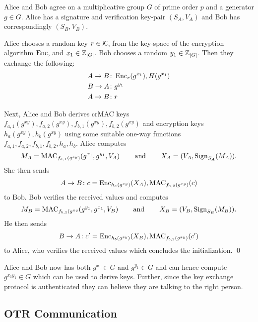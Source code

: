 \begin{protocol}\label{proto:otrinit}
  Alice and Bob agree on a multiplicative group \(G\) of prime order \(p\) and 
  a generator \(g\in G\).
  Alice has a signature and verification key-pair \((S_A, V_A)\) and Bob has 
  correspondingly \((S_B, V_B)\).

  Alice chooses a random key \(r\in \operatorname{\mathcal K}\), from the key-space of the encryption 
  algorithm \(\operatorname{\mathrm{Enc}}\), and \(x_1\in \operatorname{\mathbb Z}_{|G|}\).
  Bob chooses a random \(y_1\in \operatorname{\mathbb Z}_{|G|}\).
  Then they exchange the following:
  \begin{align*}
    A\to B &\colon \operatorname{\mathrm{Enc}}_r( g^{x_1} ), H( g^{x_1} ) \\
    B\to A &\colon g^{y_1} \\
    A\to B &\colon r
  \end{align*}

  Next, Alice and Bob derives \ac{crMAC} keys \(f_{a,1}( g^{xy} ), f_{a,2}( 
  g^{xy} ), f_{b,1}( g^{xy} ), f_{b,2}( g^{xy} )\) and encryption keys \(h_a( 
  g^{xy} ), h_b( g^{xy} )\) using some suitable one-way functions \(f_{a,1}, 
  f_{a,2}, f_{b,1}, f_{b,2}, h_a, h_b\).
  Alice computes \[M_A = \operatorname{\mathrm{MAC}}_{f_{a,1}(g^{xy})}( g^{x_1}, g^{y_1}, V_A 
  )\operatorname{\qquad and\qquad} X_A = ( V_A, \operatorname{\mathrm{Sign}}_{S_A}( M_A ) ).\]
  She then sends
  \begin{align*}
    A\to B\colon c = \operatorname{\mathrm{Enc}}_{h_a(g^{xy})}( X_A ), \operatorname{\mathrm{MAC}}_{f_{a,2}(g^{xy})}( c )
  \end{align*}
  to Bob.
  Bob verifies the received values and computes \[M_B = \operatorname{\mathrm{MAC}}_{f_{b,1}(g^{xy}}( 
  g^{y_1}, g^{x_1}, V_B )\operatorname{\qquad and\qquad} X_B = ( V_B, \operatorname{\mathrm{Sign}}_{S_B}( M_B ) ).\]
  He then sends
  \begin{align*}
    B\to A\colon c^\prime = \operatorname{\mathrm{Enc}}_{h_b(g^{xy})}( X_B ), \operatorname{\mathrm{MAC}}_{f_{b,2}(g^{xy})}( 
    c^\prime )
  \end{align*}
  to Alice, who verifies the received values which concludes the 
  initialization.
  \qed
\end{protocol}

Alice and Bob now has both \(g^{x_1}\in G\) and \(g^{y_1}\in G\) and can hence 
compute \(g^{x_1 y_1}\in G\) which can be used to derive keys.
Further, since the key exchange protocol is authenticated they can believe they 
are talking to the right person.

\subsection{\acs{OTR} Communication}

